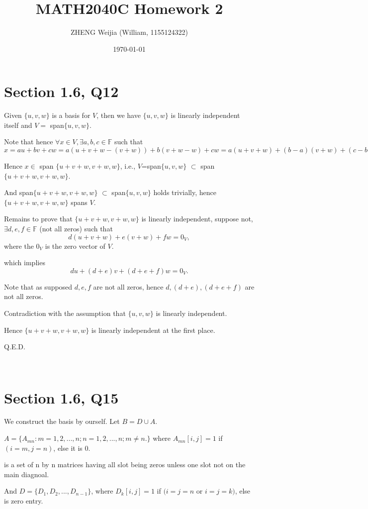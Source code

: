 \documentclass[12pt]{article}%
\begin{document}
\title{MATH2040C Homework 2}
\author{ZHENG Weijia (William, 1155124322)}
\date{\today}
\maketitle



\section{Section 1.6, Q12}

Given $\{u,v,w\}$ is a basis for $V$, then we have $\{u,v,w\}$ is linearly independent itself and $V =$ span$\{u,v,w\}$.

Note that hence $\forall x \in V, \exists a,b,c \in \mathbb{F}$ such that $x=au+bv+cw=a(u+v+w-(v+w))+b(v+w-w)+cw=a(u+v+w)+(b-a)(v+w)+(c-b)w.$

Hence $x\in$ span $\{u+v+w,v+w,w\}$, i.e., $V$=span$\{u,v,w\}$ $\subset $ span $\{u+v+w,v+w,w\}$. 

And span$\{u+v+w,v+w,w\}$ $\subset$ span$\{u,v,w\}$ holds trivially, hence $\{u+v+w,v+w,w\}$ spans $V.$

Remains to prove that $\{u+v+w,v+w,w\}$ is linearly independent, suppose not, $\exists d,e,f\in \mathbb{F}$ (not all zeros) such that $$d(u+v+w)+e(v+w)+fw=0_V,$$ where the $0_V$ is the zero vector of $V.$

which implies $$du+(d+e)v+(d+e+f)w=0_V.$$ 

Note that as supposed $d,e,f$ are not all zeros, hence $d,(d+e),(d+e+f)$ are not all zeros. 

Contradiction with the assumption that $\{u,v,w\}$ is linearly independent. 

Hence $\{u+v+w,v+w,w\}$ is linearly independent at the first place. 

Q.E.D.

~\ 

\section{Section 1.6, Q15}

We construct the basis by ourself. Let $B= D \cup A.$ 

$A=\{A_{mn}:m=1,2,...,n; n=1,2,...,n; m\neq n.\}$ where $A_{mn}[i,j]=1$ if $(i=m,j=n)$, else it is 0.

is a set of n by n matrices having all slot being zeros unless one slot not on the main diagnoal. 

And $D=\{D_1,D_2,...,D_{n-1}\}$, where $D_{k}[i,j] = 1$ if $(i=j=n $ or $ i=j=k)$, else is zero entry. 
\end{document}
